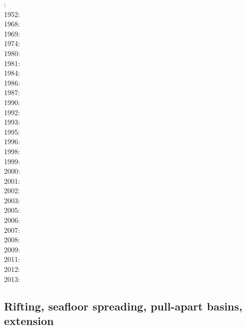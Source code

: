 : \cite{druc51}\cite{hafn51}\\
1952: \cite{drpr52}\\
1968: \cite{byer68}\\
1969: \cite{hand69}\\
1974: \cite{kogo74}\\
1980: \cite{brko80}\\
1981: \cite{delo81}\\
1984: \cite{rafi84}\cite{chpa84}\\
1986: \cite{kapf86}\\
1987: \cite{kikr87}\\
1990: \cite{wica90}\\
1992: \cite{bako92}\cite{chbo92}\cite{kali92}\cite{kohl92}\\
1993: \cite{kawu93}\\
1995: \cite{koem95}\\
1996: \cite{wasd96}\\
1998: \cite{copo98}\\
1999: \cite{kayk99}\\
2000: \cite{rydr00}\cite{rana00}\\
2001: \cite{lova01}\\
2002: \cite{hirt02}\\
2003: \cite{hiko03}\cite{kaju03}\cite{mohi03}\\
2005: \cite{didr05}\cite{drur05}\\
2006: \cite{rygw06}\cite{buwa06}\\
2007: \cite{hirw07}\cite{kohl07}\\
2008: \cite{lemm08}\cite{budr08}\cite{koka08}\\
2009: \cite{kayk09}\cite{kako09}\\
2011: \cite{lell11}\cite{kemk11}\\
2012: \cite{reyn12}\\
2013: \cite{lepo13}\cite{miam13}


\subsection*{Rifting, seafloor spreading, pull-apart basins, extension}

